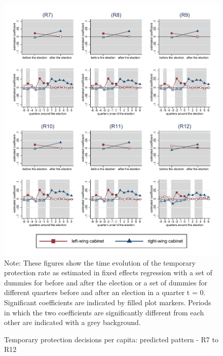 \documentclass[11pt,a4paper]{scrartcl}
\begin{document}
%
%
%
%
%
%
%
%



\clearpage
\FloatBarrier


\clearpage
\FloatBarrier
\begin{figure}[!ht]
	\caption{Temporary protection decisions per capita: predicted pattern - R7 to R12}
	\includegraphics[width=1\textwidth]{../results/decisions/temporary_protection_rate_graphs_R7-R12.pdf}
	\scriptsize{Note: These figures show the time evolution of the temporary protection rate as estimated in fixed effects regression with a set of dummies for before and after the election or a set of dummies for different quarters before and after an election in a quarter t = 0. Significant coefficients are indicated by filled plot markers. Periods in which the two coefficients are significantly different from each other are indicated with a grey background.}
\end{figure}
\end{document}
